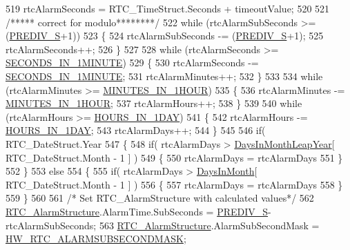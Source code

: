 \begin{DoxyCode}
519   rtcAlarmSeconds =  RTC\_TimeStruct.Seconds + timeoutValue;
520 
521   \textcolor{comment}{/***** correct for modulo********/}
522   \textcolor{keywordflow}{while} (rtcAlarmSubSeconds >= (\mbox{\hyperlink{hw__rtc_8c_a8647306f20268ae27f137e06f9e642fc}{PREDIV\_S}}+1))
523   \{
524     rtcAlarmSubSeconds -= (\mbox{\hyperlink{hw__rtc_8c_a8647306f20268ae27f137e06f9e642fc}{PREDIV\_S}}+1);
525     rtcAlarmSeconds++;
526   \}
527   
528   \textcolor{keywordflow}{while} (rtcAlarmSeconds >= \mbox{\hyperlink{hw__rtc_8c_a6bb348cf6aae2bfed39e2edd5ce0383a}{SECONDS\_IN\_1MINUTE}})
529   \{ 
530     rtcAlarmSeconds -= \mbox{\hyperlink{hw__rtc_8c_a6bb348cf6aae2bfed39e2edd5ce0383a}{SECONDS\_IN\_1MINUTE}};
531     rtcAlarmMinutes++;
532   \}
533 
534   \textcolor{keywordflow}{while} (rtcAlarmMinutes >= \mbox{\hyperlink{hw__rtc_8c_ae81e1b62f553cf38d5272acf84475f19}{MINUTES\_IN\_1HOUR}})
535   \{
536     rtcAlarmMinutes -= \mbox{\hyperlink{hw__rtc_8c_ae81e1b62f553cf38d5272acf84475f19}{MINUTES\_IN\_1HOUR}};
537     rtcAlarmHours++;
538   \}
539   
540   \textcolor{keywordflow}{while} (rtcAlarmHours >= \mbox{\hyperlink{hw__rtc_8c_acbe201bd95d21f649360773cb20ef4ff}{HOURS\_IN\_1DAY}})
541   \{
542     rtcAlarmHours -= \mbox{\hyperlink{hw__rtc_8c_acbe201bd95d21f649360773cb20ef4ff}{HOURS\_IN\_1DAY}};
543     rtcAlarmDays++;
544   \}
545 
546   \textcolor{keywordflow}{if}( RTC\_DateStruct.Year %
547   \{
548     \textcolor{keywordflow}{if}( rtcAlarmDays > \mbox{\hyperlink{hw__rtc_8c_aa0bc1427a9adc71a783c0b19e30f0384}{DaysInMonthLeapYear}}[ RTC\_DateStruct.Month - 1 ] )    
549     \{
550       rtcAlarmDays = rtcAlarmDays %
551     \}
552   \}
553   \textcolor{keywordflow}{else}
554   \{
555     \textcolor{keywordflow}{if}( rtcAlarmDays > \mbox{\hyperlink{hw__rtc_8c_a158d7c21ca90ace02ea9a6345f722689}{DaysInMonth}}[ RTC\_DateStruct.Month - 1 ] )    
556     \{   
557       rtcAlarmDays = rtcAlarmDays %
558     \}
559   \}
560 
561   \textcolor{comment}{/* Set RTC\_AlarmStructure with calculated values*/}
562   \mbox{\hyperlink{hw__rtc_8c_aa4fc8fc521debc197e4e3becd4c532a9}{RTC\_AlarmStructure}}.AlarmTime.SubSeconds = \mbox{\hyperlink{hw__rtc_8c_a8647306f20268ae27f137e06f9e642fc}{PREDIV\_S}}-rtcAlarmSubSeconds;
563   \mbox{\hyperlink{hw__rtc_8c_aa4fc8fc521debc197e4e3becd4c532a9}{RTC\_AlarmStructure}}.AlarmSubSecondMask  = 
      \mbox{\hyperlink{hw__rtc_8c_a4edfe64a5628c3b0b6e41d234443dce2}{HW\_RTC\_ALARMSUBSECONDMASK}}; 

\end{DoxyCode}
